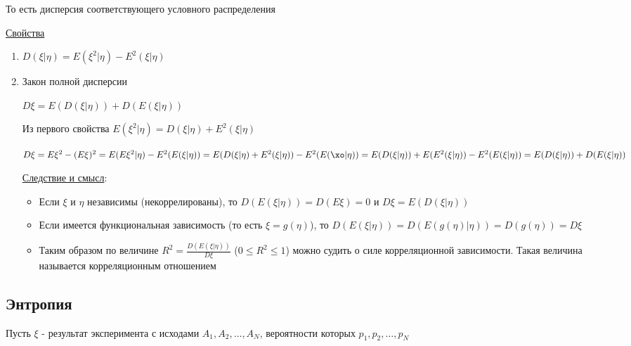 \documentclass[12pt]{article}
\begin{document}
\Nota То есть дисперсия соответствующего условного распределения

\underline{Свойства}

\begin{enumerate}
    \item $D(\xi | \eta) = E(\xi^2 | \eta) - E^2(\xi | \eta)$

    \hypertarget{lawoffullvariance}{}

    \item Закон полной дисперсии

    \begin{MyTheorem}
        \Ths $D\xi = E(D(\xi | \eta)) + D(E(\xi | \eta))$
    \end{MyTheorem}

    \begin{MyProof}
        Из первого свойства $E(\xi^2 | \eta) = D(\xi | \eta) + E^2(\xi | \eta)$

        $D\xi = E\xi^2 - (E\xi)^2 = E(E\xi^2 | \eta) - E^2(E(\xi | \eta)) = E(D(\xi | \eta) + E^2(\xi | \eta)) - E^2(E(\xo | \eta)) = E(D(\xi | \eta)) + E(E^2(\xi | \eta)) - E^2(E(\xi | \eta)) = E(D(\xi | \eta)) + D(E(\xi | \eta))$
    \end{MyProof}

    \underline{Следствие и смысл}: 
    
    \begin{itemize}
        \item Если $\xi$ и $\eta$ независимы (некоррелированы), то $D(E(\xi | \eta)) = D(E\xi) = 0$ и $D\xi = E(D(\xi | \eta))$

        \item Если имеется функциональная зависимость (то есть $\xi = g(\eta)$), то $D(E(\xi | \eta)) = D(E(g(\eta) | \eta)) = 
        D(g(\eta)) = D\xi$

        \item Таким образом по величине $R^2 = \frac{D(E(\xi | \eta))}{D\xi}$ ($0 \leq R^2 \leq 1$) можно судить о силе корреляционной зависимости.
        Такая величина называется корреляционным отношением
    \end{itemize}
\end{enumerate}

\subsection{Энтропия}

Пусть $\xi$ - результат эксперимента с исходами $A_1, A_2, \dots, A_N$, вероятности которых $p_1, p_2, \dots, p_N$
\end{document}
